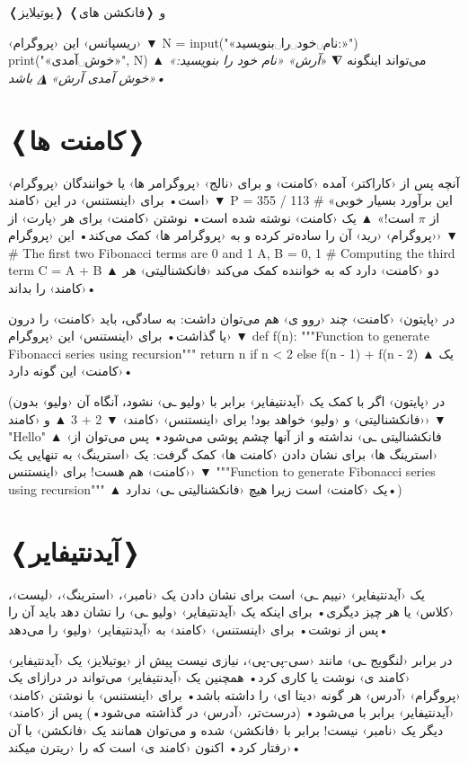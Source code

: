 \documentclass[openany, twocolumn]{book}
\begin{document}
\begin{Program}
\caption{❬یوتیلایز❭ ❬فانکشن های❭  و \label{R12}}
‹ریسپانس› این ‹پروگرام› 
▼
N = input("«نام␣خود␣را␣بنویسید:»")
print("«خوش␣آمدی»", N)
▲
 می‌تواند اینگونه 
⧩
«\em{آرش}» «نام خود را بنویسید:»
«خوش آمدی آرش»
◮
 باشد•
\end{Program}

\section{❬کامنت ها❭}
آنچه پس از ‹کاراکتر› \code{#} آمده ‹کامنت› و برای ‹نالج› ‹پروگرامر ها› یا خوانندگان ‹پروگرام› است• برای ‹اینستنس› در این ‹کامند› 
▼
P = 355 / 113 # «این برآورد بسیار خوبی از $\pi$ است!»
▲
 یک ‹کامنت› نوشته شده است• نوشتن ‹کامنت› برای هر ‹پارت› از ‹پروگرام› ‹رید› آن را ساده‌تر کرده و به ‹پروگرامر ها› کمک می‌کند• این ‹پروگرام› 
▼
# The first two Fibonacci terms are 0 and 1
A, B = 0, 1
# Computing the third term
C = A + B
▲
 دو ‹کامنت› دارد که به خواننده کمک می‌کند ‹فانکشنالیتی› هر ‹کامند› را بداند•

در ‹پایتون› ‹کامنت› چند ‹روو ی› هم می‌توان داشت: به سادگی، باید ‹کامنت› را درون  یا  گذاشت• برای ‹اینستنس› این ‹پروگرام› 
▼
def f(n):
	"""Function to generate Fibonacci series using recursion"""
	return n if n < 2 else f(n - 1) + f(n - 2)
▲
 یک ‹کامنت› این گونه دارد•

(در ‹پایتون› اگر با کمک \code{=} یک ‹آیدنتیفایر› برابر با ‹ولیو ـی› نشود، آنگاه آن ‹ولیو› بدون ‹فانکشنالیتی› و ‹ولیو› خواهد بود! برای ‹اینستنس› ‹کامند› 
▼
2 + 3
▲
 و ‹کامند› 
▼
"Hello"
▲
 ‹فانکشنالیتی ـی› نداشته و از آنها چشم پوشی می‌شود• پس می‌توان از ‹استرینگ ها› برای نشان دادن ‹کامنت ها› کمک گرفت: یک ‹استرینگ› به تنهایی یک ‹کامنت› هم هست! برای ‹اینستنس› 
▼
"""Function to generate Fibonacci series using recursion"""
▲
 یک ‹کامنت› است زیرا هیچ ‹فانکشنالیتی ـی› ندارد•)

\section{❬آیدنتیفایر❭}
یک ‹آیدنتیفایر› ‹نییم ـی› است برای نشان دادن یک ‹نامبر›، ‹استرینگ›، ‹لیست›، ‹کلاس› یا هر چیز دیگری• برای اینکه یک ‹آیدنتیفایر› ‹ولیو ـی› را نشان دهد باید آن را پس از \code{=} نوشت• برای ‹اینستنس› ‹کامند›  به ‹آیدنتیفایر›  ‹ولیو›  را می‌دهد•

در برابر ‹لنگویج ـی› مانند ‹سی-پی-پی›، نیازی نیست پیش از ‹یوتیلایز› یک ‹آیدنتیفایر› ‹کامند ی› نوشت یا کاری کرد• همچنین یک ‹آیدنتیفایر› می‌تواند در دراز‌ای یک ‹پروگرام› ‹آدرس› هر گونه ‹دیتا ای› را داشته باشد• برای ‹اینستنس› با نوشتن ‹کامند›  ‹آیدنتیفایر›  برابر با  می‌شود• (درست‌تر، ‹آدرس›  در  گذاشته می‌شود•) پس از ‹کامند›  دیگر  یک ‹نامبر› نیست!  برابر با ‹فانکشن›  شده و می‌توان همانند یک ‹فانکشن› با آن رفتار کرد• اکنون  ‹کامند ی› است که  را ‹ریترن میکند›•
\end{document}
